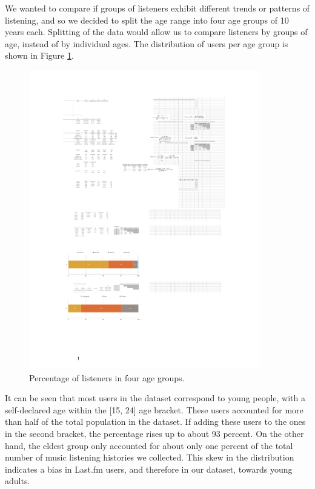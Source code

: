 We wanted to compare if groups of listeners exhibit different trends or patterns of listening, and so we decided to split the age range into four age groups of 10 years each. Splitting of the data would allow us to compare listeners by groups of age, instead of by individual ages. The distribution of users per age group is shown in Figure \ref{fig:percentage_age_groups}.



\begin{figure}[!h]
\vspace{1em}
\centering
\includegraphics[width=0.9\textwidth]{percentage_age_groups_cropped.pdf}				
\caption{Percentage of listeners in four age groups.}
\label{fig:percentage_age_groups}
\end{figure}


It can be seen that most users in the dataset correspond to young people, with a self-declared age within the [15, 24] age bracket. These users accounted for more than half of the total population in the dataset. If adding these users to the ones in the second bracket, the percentage rises up to about 93 percent. On the other hand, the eldest group only accounted for about only one percent of the total number of music listening histories we collected. This skew in the distribution indicates a bias in Last.fm  users, and therefore in our dataset, towards young adults. 






